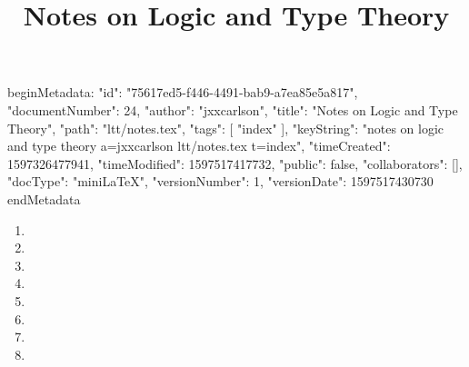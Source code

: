 beginMetadata:
{
    "id": "75617ed5-f446-4491-bab9-a7ea85e5a817",
    "documentNumber": 24,
    "author": "jxxcarlson",
    "title": "Notes on Logic and Type Theory",
    "path": "ltt/notes.tex",
    "tags": [
        "index"
    ],
    "keyString": "notes on logic and type theory a=jxxcarlson ltt/notes.tex t=index",
    "timeCreated": 1597326477941,
    "timeModified": 1597517417732,
    "public": false,
    "collaborators": [],
    "docType": "miniLaTeX",
    "versionNumber": 1,
    "versionDate": 1597517430730
}
endMetadata
\title{Notes on Logic and Type Theory}

\maketitle

\begin{enumerate}

\item {}

\item {}

\item {}

\item {}

\item {}

\item {}


\item {}

\item {}

\end{enumerate}
